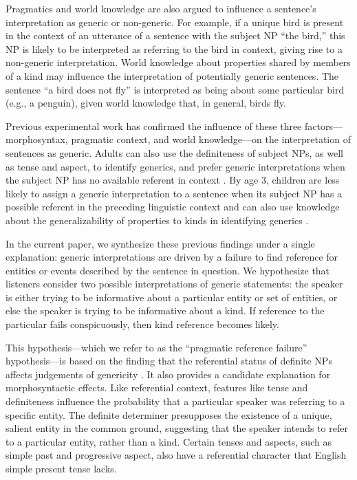 \documentclass[10pt,letterpaper]{article}
\begin{document}
Pragmatics and world knowledge are also argued to influence a sentence's interpretation as generic or non-generic. For example, if a unique bird is present in the context of an utterance of a sentence with the subject NP ``the bird,'' this NP is likely to be interpreted as referring to the bird in context, giving rise to a non-generic interpretation. World knowledge about properties shared by members of a kind may influence the interpretation of potentially generic sentences. The sentence ``a bird does not fly'' is interpreted as being about some particular bird (e.g., a penguin), given world knowledge that, in general, birds fly.

Previous experimental work has confirmed the influence of these three factors---morphosyntax, pragmatic context, and world knowledge---on the interpretation of sentences as generic. Adults can also use the definiteness of subject NPs, as well as tense and aspect, to identify generics, and prefer generic interpretations when the subject NP has no available referent in context \cite{Gelman:2003,Cimpian:2011}. By age 3, children are less likely to assign a generic interpretation to a sentence when its subject NP has a possible referent in the preceding linguistic context and can also use knowledge about the generalizability of properties to kinds in identifying generics \cite{Cimpian:2008}.


In the current paper, we synthesize these previous findings under a single explanation: generic interpretations are driven by a failure to find reference for entities or events described by the sentence in question. We hypothesize that listeners consider two possible interpretations of generic statements: the speaker is either trying to be informative about a particular entity or set of entities, or else the speaker is trying to be informative about a kind. If reference to the particular fails conspicuously, then kind reference becomes likely.

This hypothesis---which we refer to as the ``pragmatic reference failure'' hypothesis---is based on the finding that the referential status of definite NPs affects judgements of genericity \cite{Gelman:2003}. It also provides a candidate explanation for morphosyntactic effects. Like referential context, features like tense and definiteness influence the probability that a particular speaker was referring to a specific entity. The definite determiner presupposes the existence of a unique, salient entity in the common ground, suggesting that the speaker intends to refer to a particular entity, rather than a kind. Certain tenses and aspects, such as simple past and progressive aspect, also have a referential character that English simple present tense lacks. 
\end{document}
